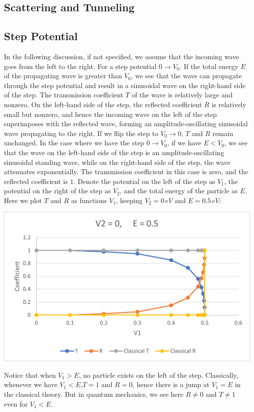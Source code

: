 \documentclass[11pt]{book}
\theoremstyle{break}
\theoremstyle{break}
\begin{document}
\subsection*{Scattering and Tunneling}
\subsection{Step Potential}
In the following discussion, if not specified, we assume that the incoming wave goes from the left to the right. For a step potential $0\to V_0$. If the total energy $E$ of the propagating wave is greater than $V_0$, we see that the wave can propagate through the step potential and result in a sinusoidal wave on the right-hand side of the step. The transmission coefficient $T$ of the wave is relatively large and nonzero. On the left-hand side of the step, the reflected coefficient $R$ is relatively small but nonzero, and hence the incoming wave on the left of the step superimposes with the reflected wave, forming an amplitude-oscillating sinusoidal wave propagating to the right. If we flip the step to $V_0 \to 0$, $T$ and $R$ remain unchanged. In the case where we have the step $0\to V_0$, if we have $E<V_0$, we see that the wave on the left-hand side of the step is an amplitude-oscillating sinusoidal standing wave, while on the right-hand side of the step, the wave attenuates exponentially. The transmission coefficient in this case is zero, and the reflected coefficient is $1$. Denote the potential on the left of the step as $V_1$, the potential on the right of the step as $V_2$, and the total energy of the particle as $E$.\\

Here we plot $T$ and $R$ as functions $V_1$, keeping $V_2=0\, eV$ and $E=0.5\, eV$:
\begin{center}
\includegraphics[scale=1.19]{TR1}
\end{center}
Notice that when $V_1 >E$, no particle exists on the left of the step. Classically, whenever we have $V_1 < E$,$T=1$ and $R=0$, hence there is a jump at $V_1 = E$ in the classical theory. But in quantum mechanics, we see here $R\neq 0$ and $T\neq 1$ even for $V_1<E$. \\
\end{document}
